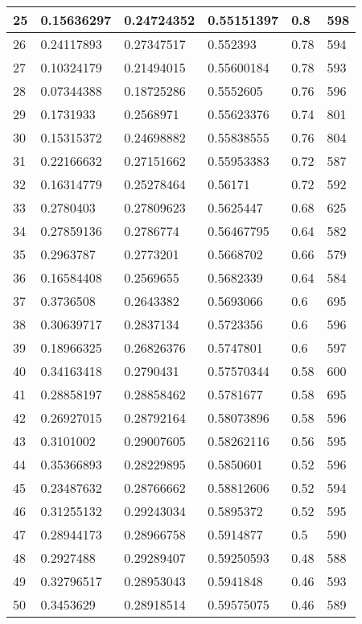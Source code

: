 \begin{longtable}{|l|l|l|l|l|l|}
25 & 0.15636297 & 0.24724352 & 0.55151397 & 0.8 & 598 \\ \hline 
26 & 0.24117893 & 0.27347517 & 0.552393 & 0.78 & 594 \\ \hline 
27 & 0.10324179 & 0.21494015 & 0.55600184 & 0.78 & 593 \\ \hline 
28 & 0.07344388 & 0.18725286 & 0.5552605 & 0.76 & 596 \\ \hline 
29 & 0.1731933 & 0.2568971 & 0.55623376 & 0.74 & 801 \\ \hline 
30 & 0.15315372 & 0.24698882 & 0.55838555 & 0.76 & 804 \\ \hline 
31 & 0.22166632 & 0.27151662 & 0.55953383 & 0.72 & 587 \\ \hline 
32 & 0.16314779 & 0.25278464 & 0.56171 & 0.72 & 592 \\ \hline 
33 & 0.2780403 & 0.27809623 & 0.5625447 & 0.68 & 625 \\ \hline 
34 & 0.27859136 & 0.2786774 & 0.56467795 & 0.64 & 582 \\ \hline 
35 & 0.2963787 & 0.2773201 & 0.5668702 & 0.66 & 579 \\ \hline 
36 & 0.16584408 & 0.2569655 & 0.5682339 & 0.64 & 584 \\ \hline 
37 & 0.3736508 & 0.2643382 & 0.5693066 & 0.6 & 695 \\ \hline 
38 & 0.30639717 & 0.2837134 & 0.5723356 & 0.6 & 596 \\ \hline 
39 & 0.18966325 & 0.26826376 & 0.5747801 & 0.6 & 597 \\ \hline 
40 & 0.34163418 & 0.2790431 & 0.57570344 & 0.58 & 600 \\ \hline 
41 & 0.28858197 & 0.28858462 & 0.5781677 & 0.58 & 695 \\ \hline 
42 & 0.26927015 & 0.28792164 & 0.58073896 & 0.58 & 596 \\ \hline 
43 & 0.3101002 & 0.29007605 & 0.58262116 & 0.56 & 595 \\ \hline 
44 & 0.35366893 & 0.28229895 & 0.5850601 & 0.52 & 596 \\ \hline 
45 & 0.23487632 & 0.28766662 & 0.58812606 & 0.52 & 594 \\ \hline 
46 & 0.31255132 & 0.29243034 & 0.5895372 & 0.52 & 595 \\ \hline 
47 & 0.28944173 & 0.28966758 & 0.5914877 & 0.5 & 590 \\ \hline 
48 & 0.2927488 & 0.29289407 & 0.59250593 & 0.48 & 588 \\ \hline 
49 & 0.32796517 & 0.28953043 & 0.5941848 & 0.46 & 593 \\ \hline 
50 & 0.3453629 & 0.28918514 & 0.59575075 & 0.46 & 589 \\ \hline 
\end{longtable}